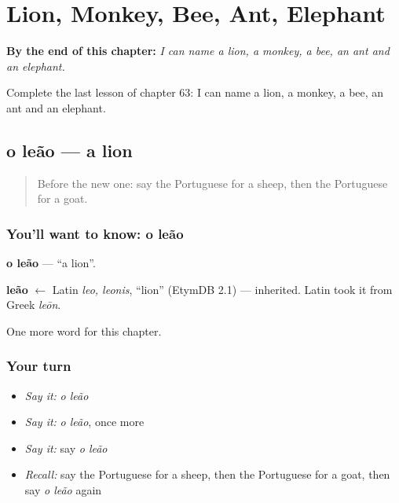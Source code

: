 
\chapter{Lion, Monkey, Bee, Ant, Elephant}
\label{ch:pt-lion-monkey-bee-ant-elephant}

\begin{chapteropening}
\textbf{By the end of this chapter:} \emph{I can name a lion, a monkey, a bee, an ant and an elephant.}

Complete the last lesson of chapter 63: I can name a lion, a monkey, a bee, an ant and an elephant.
\end{chapteropening}

\section[o leão]{o leão — a lion}

\label{lesson:PT-C63-leao}



\begin{quote}
Before the new one: say the Portuguese for a sheep, then the Portuguese for a goat.
\end{quote}

\subsection*{You'll want to know: o leão}
\textbf{o leão} — \textquotedblleft{}a lion\textquotedblright{}.

\begin{cousinweb}
\textbf{leão} $\leftarrow$ Latin \emph{leo, leonis}, \textquotedblleft{}lion\textquotedblright{} (EtymDB 2.1) — inherited. Latin took it from Greek \emph{leōn}.
\end{cousinweb}

\begin{grammarlens}[title={What you've built}]
One more word for this chapter.
\end{grammarlens}

\subsection*{Your turn}
\begin{itemize}
\raggedright
  \item \emph{Say it:} \emph{o leão}
  \item \emph{Say it:} \emph{o leão}, once more
  \item \emph{Say it:} say \emph{o leão}
  \item \emph{Recall:} say the Portuguese for a sheep, then the Portuguese for a goat, then say \emph{o leão} again
\end{itemize}

